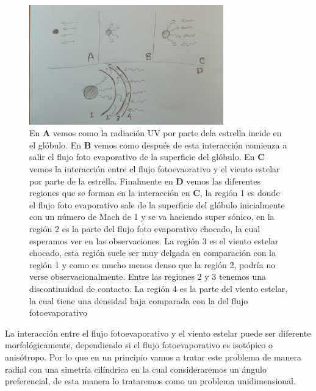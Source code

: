 \documentclass{book}
\begin{document}
\begin{figure}[h]
    \centering
    \includegraphics[width=0.75\textwidth]{Chp2_zones.jpg}
    \caption{En \textbf{A} vemos como la radiación UV por parte dela estrella incide en el glóbulo. En \textbf{B} vemos como después de esta interacción comienza a salir el flujo foto evaporativo de la superficie del glóbulo. En \textbf{C} vemos la interacción entre el flujo fotoevaorativo y el viento estelar por parte de la estrella. Finalmente en \textbf{D} vemos las diferentes regiones que se forman en la interacción en \textbf{C}, la  región 1 es donde el flujo foto evaporativo sale de la superficie del glóbulo inicialmente con un número de Mach de 1 y se va haciendo super sónico, en la región 2 es la parte del flujo foto evaporativo chocado, la cual esperamos ver en las observaciones. La región 3 es el viento estelar chocado, esta región suele ser muy delgada en comparación con la región 1 y como es mucho menos denso que la región 2, podría no verse observacionalmente. Entre las regiones 2 y 3 tenemos una discontinuidad de contacto. La región 4 es la parte del viento estelar, la cual tiene una densidad baja comparada con la del flujo fotoevaporativo}
    \label{fig:zones}
\end{figure}

La interacción entre el flujo fotoevaporativo y el viento estelar puede ser diferente morfológicamente, dependiendo si el flujo fotoevaporativo es isotópico o anisótropo. Por lo que en un principio vamos a tratar este problema de manera radial con una simetría cilíndrica en la cual consideraremos un ángulo preferencial, de esta manera lo trataremos como un problema unidimensional.
\end{document}
